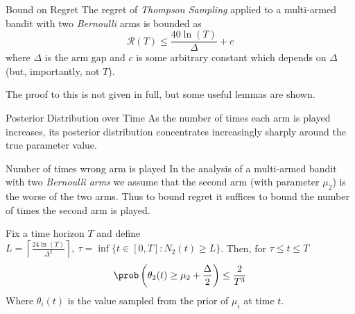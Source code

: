 \documentclass[11pt,a4paper]{article}
\begin{document}
  \begin{theorem}{Bound on Regret}
    The regret of \textit{Thompson Sampling} applied to a multi-armed bandit with two \textit{Bernoulli} arms is bounded as
    \[ \mathcal{R}(T)\leq\frac{40\ln(T)}\Delta+c \]
    where $\Delta$ is the arm gap and $c$ is some arbitrary constant which depends on $\Delta$ (but, importantly, not $T$).
    \par The proof to this is not given in full, but some useful lemmas are shown.
  \end{theorem}

  \begin{remark}{Posterior Distribution over Time}
    As the number of times each arm is played increases, its posterior distribution concentrates increasingly sharply around the true parameter value.
  \end{remark}

  \begin{proposition}{Number of times wrong arm is played}
    In the analysis of a multi-armed bandit with two \textit{Bernoulli arms} we assume that the second arm (with parameter $\mu_2$) is the worse of the two arms. Thus to bound regret it suffices to bound the number of times the second arm is played.
    \par Fix a time horizon $T$ and define $L=\left\lceil\frac{24\ln(T)}{\Delta^2}\right\rceil,\ \tau=\inf\{t\in[0,T]:N_2(t)\geq L\}$. Then, for $\tau\leq t\leq T$
    \[ \prob\left(\theta_2(t)\geq\mu_2+\frac\Delta2\right)\leq\frac2{T^3} \]
    Where $\theta_i(t)$ is the value sampled from the prior of $\mu_i$ at time $t$.
  \end{proposition}
\end{document}
